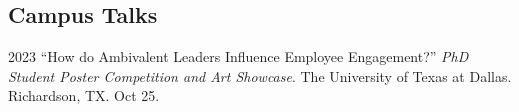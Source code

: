 \documentclass[12pt,letterpaper]{report} %
\begin{document}









    \subsection*{Campus Talks}

    \begin{tablist}


        \item[2023]\tab{}\enquote{How do Ambivalent Leaders Influence Employee Engagement?} \textit{PhD Student Poster Competition and Art Showcase}. The University of Texas at Dallas. Richardson, TX. Oct 25.

    \end{tablist}


\end{document}
